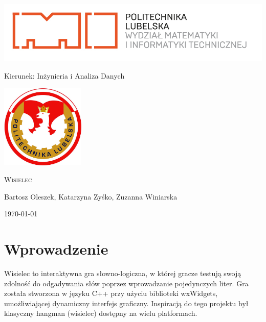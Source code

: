 \documentclass[]{report}
\begin{document}
	
\begin{titlepage}
	\centering

	\vspace{1cm}
	
	\includegraphics[width=1.0\textwidth]{logowmit.png} %
	
	\vspace{1cm}
	
	Kierunek: Inżynieria i Analiza Danych %
	
	\vspace{1.5cm}
	\includegraphics[width=0.3\textwidth]{PL.jpeg} %
	
	\vspace{1cm}
	{\scshape\Large Wisielec \par} %
	
	\vspace{1.5cm}
	{\Large Bartosz Oleszek, Katarzyna Zyśko, Zuzanna Winiarska \par} %
	
	\vfill
	{\large \today\par}
\end{titlepage}


\tableofcontents
	
\newpage 


	\section*{Wprowadzenie}
	
	Wisielec to interaktywna gra słowno-logiczna, w której gracze testują swoją zdolność do odgadywania słów poprzez wprowadzanie pojedynczych liter. Gra została stworzona w języku C++ przy użyciu biblioteki wxWidgets, umożliwiającej dynamiczny interfejs graficzny. Inspiracją do tego projektu był klasyczny hangman (wisielec) dostępny na wielu platformach.
	
\end{document}
